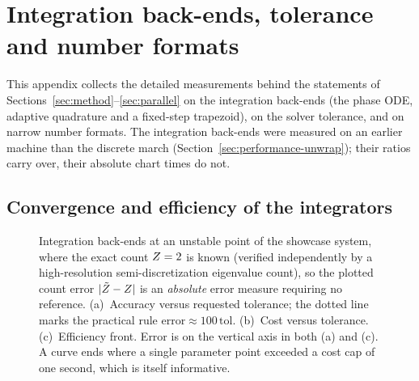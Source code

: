 \section{Integration back-ends, tolerance and number formats}\label{app:backends}

This appendix collects the detailed measurements behind the statements of
Sections~\ref{sec:method}--\ref{sec:parallel} on the integration back-ends
(the phase ODE, adaptive quadrature and a fixed-step trapezoid), on the
solver tolerance, and on narrow number formats. The integration back-ends
were measured on an earlier machine than the discrete march
(Section~\ref{sec:performance-unwrap}); their ratios carry over, their
absolute chart times do not.

\subsection{Convergence and efficiency of the integrators}\label{sec:performance-convergence}

\begin{figure}[tb]
  \centering
  \caption{Integration back-ends at an unstable point of the
  showcase system, where the exact count $Z=2$ is known (verified
  independently by a high-resolution semi-discretization eigenvalue count),
  so the plotted count error $|\Zraw-\Zint|$ is an \emph{absolute} error
  measure requiring no reference. (a)~Accuracy versus requested tolerance;
  the dotted line marks the practical rule
  $\mathrm{error}\approx100\,\mathrm{tol}$. (b)~Cost versus
  tolerance. (c)~Efficiency front. Error is on the vertical axis in both (a)
  and (c). A curve ends where a single parameter point exceeded a cost cap of
  one second, which is itself informative.}\label{fig:convergence}
\end{figure}

\begin{table}[tb]
  \centering
  \caption{Count error $|\Zraw-\Zint|$ (left block) and single-point CPU time
  (right block) of the back-ends at selected tolerances; system and point as
  in Fig.~\ref{fig:convergence}.}\label{tab:convergence}
\end{table}

